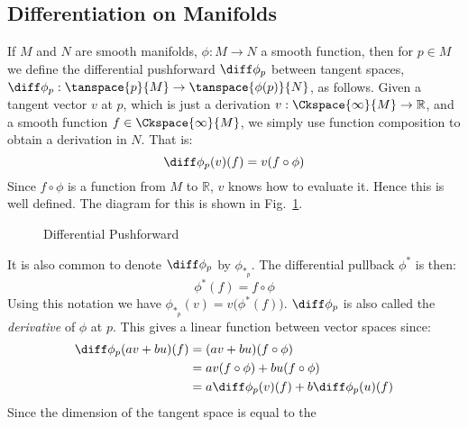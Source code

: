     \subsection{Differentiation on Manifolds}
        If $M$ and $N$ are smooth manifolds, $\phi:M\rightarrow{N}$ a
        smooth function, then for $p\in{M}$ we define the differential
        pushforward $\diff\phi_{p}$ between tangent spaces,
        $\diff\phi_{p}:\tanspace{p}{M}\rightarrow\tanspace{\phi(p)}{N}$,
        as follows. Given a tangent vector $v$ at $p$, which is just a
        derivation $v:\Ckspace{\infty}{M}\rightarrow\mathbb{R}$, and a
        smooth function $f\in\Ckspace{\infty}{M}$, we simply use
        function composition to obtain a derivation in $N$. That is:
        \begin{equation}
            \diff\phi_{p}(v)(f)=v(f\circ\phi)
        \end{equation}
        Since $f\circ\phi$ is a function from $M$ to $\mathbb{R}$, $v$
        knows how to evaluate it. Hence this is well defined. The
        diagram for this is shown in
        Fig.~\ref{fig:Differential_Pushforward}.
        \begin{figure}[H]
            \centering
            \captionsetup{type=figure}
            
            \caption{Differential Pushforward}
            \label{fig:Differential_Pushforward}
        \end{figure}
        It is also common to denote $\diff\phi_{p}$ by
        $\phi_{*_{p}}$. The differential pullback $\phi^{*}$ is then:
        \begin{equation}
            \phi^{*}(f)=f\circ\phi
        \end{equation}
        Using this notation we have
        $\phi_{*_{p}}(v)=v\big(\phi^{*}(f)\big)$. $\diff\phi_{p}$ is
        also called the \textit{derivative} of $\phi$ at $p$. This gives
        a linear function between vector spaces since:
        \begin{subequations}
            \begin{align}
                \diff\phi_{p}(av+bu)(f)&=(av+bu)(f\circ\phi)\\
                &=av(f\circ\phi)+bu(f\circ\phi)\\
                &=a\diff\phi_{p}(v)(f)+b\diff\phi_{p}(u)(f)
            \end{align}
        \end{subequations}
        Since the dimension of the tangent space is equal to the
